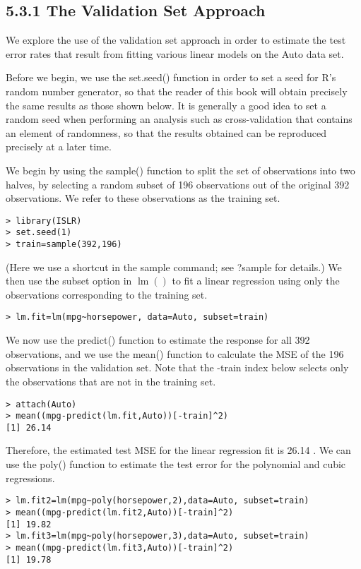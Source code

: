 \documentclass[10pt]{article}
\begin{document}
\subsection*{5.3.1 The Validation Set Approach}
We explore the use of the validation set approach in order to estimate the test error rates that result from fitting various linear models on the Auto data set.

Before we begin, we use the set.seed() function in order to set a seed for R's random number generator, so that the reader of this book will obtain precisely the same results as those shown below. It is generally a good idea to set a random seed when performing an analysis such as cross-validation that contains an element of randomness, so that the results obtained can be reproduced precisely at a later time.

We begin by using the sample() function to split the set of observations into two halves, by selecting a random subset of 196 observations out of the original 392 observations. We refer to these observations as the training set.

\begin{verbatim}
> library(ISLR)
> set.seed(1)
> train=sample(392,196)
\end{verbatim}

(Here we use a shortcut in the sample command; see ?sample for details.) We then use the subset option in $\operatorname{lm}()$ to fit a linear regression using only the observations corresponding to the training set.

\begin{verbatim}
> lm.fit=lm(mpg~horsepower, data=Auto, subset=train)
\end{verbatim}

We now use the predict() function to estimate the response for all 392 observations, and we use the mean() function to calculate the MSE of the 196 observations in the validation set. Note that the -train index below selects only the observations that are not in the training set.

\begin{verbatim}
> attach(Auto)
> mean((mpg-predict(lm.fit,Auto))[-train]^2)
[1] 26.14
\end{verbatim}

Therefore, the estimated test MSE for the linear regression fit is 26.14 . We can use the poly() function to estimate the test error for the polynomial and cubic regressions.

\begin{verbatim}
> lm.fit2=lm(mpg~poly(horsepower,2),data=Auto, subset=train)
> mean((mpg-predict(lm.fit2,Auto))[-train]^2)
[1] 19.82
> lm.fit3=lm(mpg~poly(horsepower,3),data=Auto, subset=train)
> mean((mpg-predict(lm.fit3,Auto))[-train]^2)
[1] 19.78
\end{verbatim}
\end{document}
